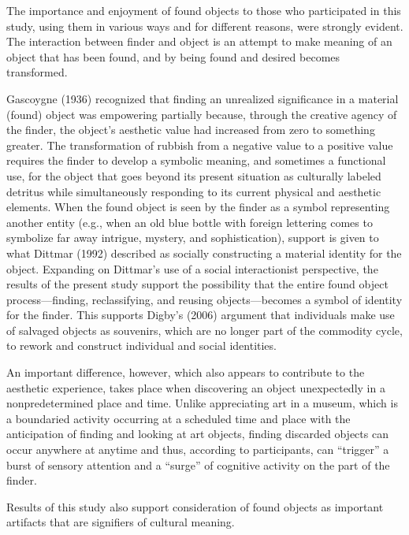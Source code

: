 The importance and enjoyment of found objects to those who participated in this study, using them in various ways and for different reasons, were strongly evident. The interaction between finder and object is an attempt to make meaning of an object that has been found, and by being found and desired becomes transformed.

Gascoygne (1936) recognized that finding an unrealized significance in a material (found) object was empowering partially because, through the creative agency of the finder, the object’s aesthetic value had increased from zero to something greater. The transformation of rubbish from a negative value to a positive value requires the finder to develop a symbolic meaning, and sometimes a functional use, for the object that goes beyond its present situation as culturally labeled detritus while simultaneously responding to its current physical and aesthetic elements. When the found object is seen by the finder as a symbol representing another entity (e.g., when an old blue bottle with foreign lettering comes to symbolize far away intrigue, mystery, and sophistication), support is given to what Dittmar (1992) described as socially constructing a material identity for the object. Expanding on Dittmar’s use of a social interactionist perspective, the results of the present study support the possibility that the entire found object process---finding, reclassifying, and reusing objects---becomes a symbol of identity for the finder. This supports Digby’s (2006) argument that individuals make use of salvaged objects as souvenirs, which are no longer part of the commodity cycle, to rework and construct individual and social identities.

An important difference, however, which also appears to contribute to the aesthetic experience, takes place when discovering an object unexpectedly in a nonpredetermined place and time. Unlike appreciating art in a museum, which is a boundaried activity occurring at a scheduled time and place with the anticipation of finding and looking at art objects, finding discarded objects can occur anywhere at anytime and thus, according to participants, can “trigger” a burst of sensory attention and a “surge” of cognitive activity on the part of the finder. 

Results of this study also support consideration of found objects as important artifacts that are signifiers of cultural meaning.

